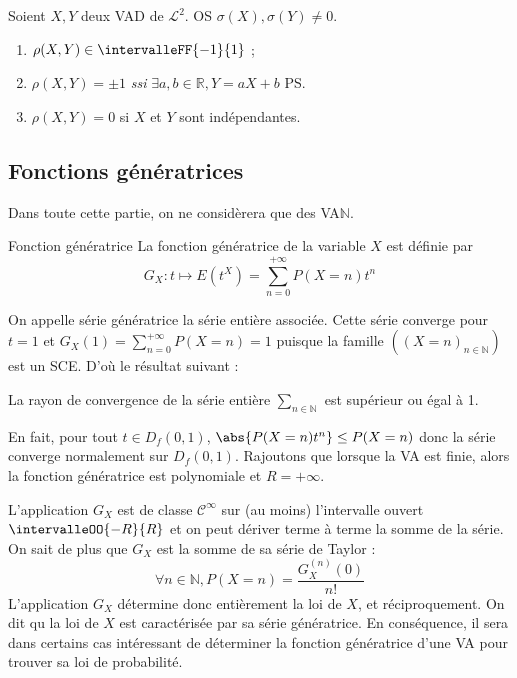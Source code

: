     \begin{prop}{}{}
        Soient $X,Y$ deux VAD de $\mathcal{L}^2$. OS $\sigma(X), \sigma(Y) \neq 0$.
        \begin{enumerate}
            \item $\rho(X,Y) \in \intervalleFF{-1}{1}$ ;
            \item $\rho(X,Y) = \pm 1$ \textit{ssi} $\exists a,b \in \mathbb{R}, Y = a X + b$ PS.
            \item $\rho(X,Y) = 0$ si $X$ et $Y$ sont indépendantes.
        \end{enumerate}
    \end{prop}

\subsection{Fonctions génératrices}

    Dans toute cette partie, on ne considèrera que des VA$\mathbb{N}$. 

    \begin{defi}{Fonction génératrice}{}
        La fonction génératrice de la variable $X$ est définie par 
        \[ G_X : t \mapsto E(t^X) = \sum_{n=0}^{+\infty} P(X = n) t^n \]   
    \end{defi}

    On appelle série génératrice la série entière associée. Cette série converge pour $t = 1$ et $G_X(1) = \sum_{n=0}^{+\infty} P(X = n) = 1$ puisque la famille $((X = n)_{n \in \mathbb{N}})$ est un SCE. D’où le résultat suivant :

    \begin{prop}{}{}
        La rayon de convergence de la série entière $\sum_{n \in \mathbb{N}}$ est supérieur ou égal à 1.
    \end{prop}

    En fait, pour tout $t \in D_f(0,1)$, $\abs{P(X = n) t^n} \leq P(X = n)$ donc la série converge normalement sur $D_f(0,1)$. Rajoutons que lorsque la VA est finie, alors la fonction génératrice est polynomiale et $R = +\infty$.

    L’application $G_X$ est de classe $\mathcal{C}^{\infty}$ sur (au moins) l’intervalle ouvert $\intervalleOO{-R}{R}$ et on peut dériver terme à terme la somme de la série. On sait de plus que $G_X$ est la somme de sa série de Taylor : 
    \[ \forall n \in \mathbb{N}, P(X = n) = \frac{G_X^{(n)}(0)}{n!} \]    
    L’application $G_X$ détermine donc entièrement la loi de $X$, et réciproquement. On dit qu la loi de $X$ est caractérisée par sa série génératrice. En conséquence, il sera dans certains cas intéressant de déterminer la fonction génératrice d’une VA pour trouver sa loi de probabilité. 

